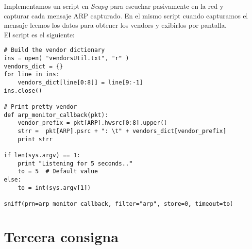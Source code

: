 \documentclass[a4paper]{article}
\begin{document}
Implementamos un script en \textit{Scapy} para escuchar pasivamente en la red y capturar cada mensaje ARP capturado. En el mismo script cuando capturamos el mensaje leemos los datos para obtener los vendors y exibirlos por pantalla.\\

El script es el siguiente:

\begin{verbatim}
# Build the vendor dictionary
ins = open( "vendorsUtil.txt", "r" )
vendors_dict = {}
for line in ins:
    vendors_dict[line[0:8]] = line[9:-1] 
ins.close()

# Print pretty vendor
def arp_monitor_callback(pkt):
	vendor_prefix = pkt[ARP].hwsrc[0:8].upper()
	strr =  pkt[ARP].psrc + ": \t" + vendors_dict[vendor_prefix]
	print strr

if len(sys.argv) == 1:
	print "Listening for 5 seconds.."
	to = 5  # Default value
else:
	to = int(sys.argv[1]) 

sniff(prn=arp_monitor_callback, filter="arp", store=0, timeout=to)
\end{verbatim}


\section{Tercera consigna}


 
\end{document}
